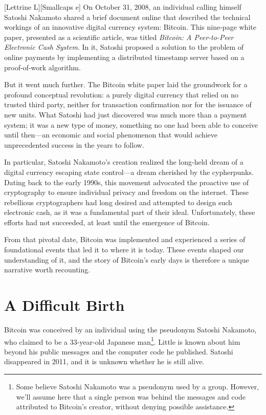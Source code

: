 \documentclass[
  a5paper,
  smalldemyvopaper,10pt,twoside,onecolumn,openright,extrafontsizes,hidelinks]{memoir}
\begin{document}
{[}Lettrine L{]}{[}Smallcaps e{]} On October 31, 2008, an individual
calling himself Satoshi Nakamoto shared a brief document online that
described the technical workings of an innovative digital currency
system: Bitcoin. This nine-page white paper, presented as a scientific
article, was titled \emph{Bitcoin: A Peer-to-Peer Electronic Cash
System}. In it, Satoshi proposed a solution to the problem of online
payments by implementing a distributed timestamp server based on a
proof-of-work algorithm.

But it went much further. The Bitcoin white paper laid the groundwork
for a profound conceptual revolution: a purely digital currency that
relied on no trusted third party, neither for transaction confirmation
nor for the issuance of new units. What Satoshi had just discovered was
much more than a payment system; it was a new type of money, something
no one had been able to conceive until then---an economic and social
phenomenon that would achieve unprecedented success in the years to
follow.

In particular, Satoshi Nakamoto's creation realized the long-held dream
of a digital currency escaping state control---a dream cherished by the
cypherpunks. Dating back to the early 1990s, this movement advocated the
proactive use of cryptography to ensure individual privacy and freedom
on the internet. These rebellious cryptographers had long desired and
attempted to design such electronic cash, as it was a fundamental part
of their ideal. Unfortunately, these efforts had not succeeded, at least
until the emergence of Bitcoin.

From that pivotal date, Bitcoin was implemented and experienced a series
of foundational events that led it to where it is today. These events
shaped our understanding of it, and the story of Bitcoin's early days is
therefore a unique narrative worth recounting.

\section*{A Difficult Birth}\label{une-naissance-difficile}


Bitcoin was conceived by an individual using the pseudonym Satoshi
Nakamoto, who claimed to be a 33-year-old Japanese man\footnote{Some
  believe Satoshi Nakamoto was a pseudonym used by a group. However,
  we'll assume here that a single person was behind the messages and
  code attributed to Bitcoin's creator, without denying possible
  assistance.}. Little is known about him beyond his public messages and
the computer code he published. Satoshi disappeared in 2011, and it is
unknown whether he is still alive.
\end{document}
